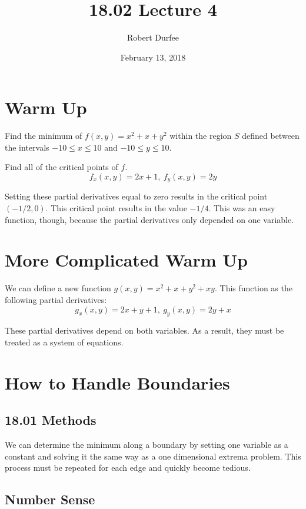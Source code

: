 \documentclass{article}
\title{ 18.02 Lecture 4 }
\author{ Robert Durfee }
\date{ February 13, 2018 }
\begin{document}
\maketitle

\section{ Warm Up }

Find the minimum of $f(x, y) = x^{2} + x + y^{2}$ within the region $S$ defined
between the intervals $-10 \leq x \leq 10$ and $-10 \leq y \leq 10$.

\bigbreak

Find all of the critical points of $f$.
$$ f_{x}(x, y) = 2x + 1, \ f_{y}(x, y) = 2y $$

Setting these partial derivatives equal to zero results in the critical point
$(-1/2, 0)$. This critical point results in the value $-1/4$. This was an easy
function, though, because the partial derivatives only depended on one variable.

\section{More Complicated Warm Up}

We can define a new function $g(x, y) = x^{2} + x + y^{2} + xy$. This function
as the following partial derivatives:
$$ g_{x}(x, y) = 2x + y + 1, \ g_{y}(x, y) = 2y + x $$

These partial derivatives depend on both variables. As a result, they must be
treated as a system of equations.

\section{How to Handle Boundaries}

\subsection{18.01 Methods}

We can determine the minimum along a boundary by setting one variable as a
constant and solving it the same way as a one dimensional extrema problem. This
process must be repeated for each edge and quickly become tedious.

\subsection{Number Sense}
\end{document}
